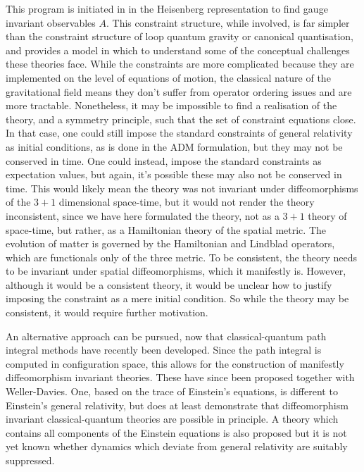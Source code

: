 \documentclass[aps,pra,showpacs,citeautoscript,amsmath,amssymb,floatfix,superscriptaddress,bbm, verbatim,amsfonts,changes,12pt,nofootinbib,longbibliography]{revtex4-2}
\begin{document}
This program is initiated in \cite{UCL2022constraints} in the Heisenberg representation to find gauge invariant observables $A$.
This constraint structure, while involved, is far simpler than the constraint structure of loop quantum gravity or canonical quantisation, and provides a model in which to understand some of the conceptual challenges these theories face.
While the constraints are more complicated because they are implemented on the level of equations of motion, the classical nature of the gravitational field means they don't suffer from operator ordering issues and are more tractable. Nonetheless, it may be  impossible to find a realisation of the theory, and a symmetry principle, such that the set of constraint equations close. In that case, one could still impose the standard constraints of general relativity as initial conditions, as is done in the ADM formulation, but they may not be conserved in time. One could instead, impose the standard constraints as expectation values, but again, it's possible these may also not be conserved in time. This would likely mean the theory was not invariant under diffeomorphisms of the $3+1$ dimensional space-time, but it would not render the theory inconsistent, since we have here formulated the theory, not as a $3+1$ theory of space-time, but rather, 
 as a Hamiltonian theory of the spatial metric. The evolution of matter is governed by the Hamiltonian and Lindblad operators, which are functionals only of the three metric. To be consistent, the theory needs to be invariant under spatial diffeomorphisms, which it manifestly is. However, although it would be a consistent theory, it would be unclear how to justify imposing the constraint as a mere initial condition. So while the theory may be consistent, it would require further motivation. 
 
 An alternative approach can  be pursued, now that classical-quantum path integral methods have recently been developed\cite{oppenheim2023path}.  Since the path integral is computed in configuration space, this allows for the construction of manifestly diffeomorphism invariant theories. These have since been proposed together with Weller-Davies\cite{oppenheim2023covariant}. One, based on the trace of Einstein's equations, is different to Einstein's general relativity, but does at least demonstrate that diffeomorphism invariant classical-quantum theories are possible in principle. A theory which contains all components of the Einstein equations is also proposed but it is not yet known whether dynamics which deviate from general relativity are suitably suppressed. 
\end{document}
